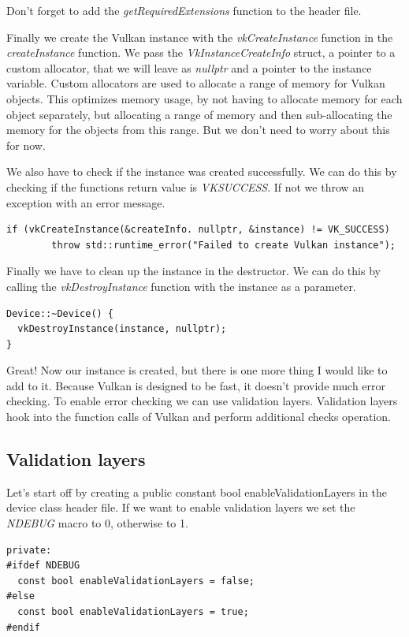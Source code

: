 \documentclass[12pt]{report} \usepackage{preamble}
\begin{document}
Don't forget to add the \textit{getRequiredExtensions} function to the header file.

Finally we create the Vulkan instance with the \textit{vkCreateInstance} function in the
\textit{createInstance} function. We pass the \textit{VkInstanceCreateInfo} struct, a pointer to
a custom allocator, that we will leave as \textit{nullptr} and a pointer to the instance variable.
Custom allocators are used to allocate a range of memory for Vulkan objects. This optimizes memory usage, by
not having to allocate memory for each object separately, but allocating a range of memory and then
sub-allocating the memory for the objects from this range. But we don't need to worry about this for now.

We also have to check if the instance was created successfully. We can do this by checking if the
functions return value is \textit{VK\textunderscore SUCCESS}. If not we throw an exception with an error message.

\begin{lstlisting}[Language=C++]
if (vkCreateInstance(&createInfo. nullptr, &instance) != VK_SUCCESS) 
		throw std::runtime_error("Failed to create Vulkan instance");
\end{lstlisting}

Finally we have to clean up the instance in the destructor. We can do this by calling the
\textit{vkDestroyInstance} function with the instance as a parameter.

\begin{lstlisting}[Language=C++]
Device::~Device() {
  vkDestroyInstance(instance, nullptr);
}
\end{lstlisting}

Great! Now our instance is created, but there is one more thing I would like to
add to it. Because Vulkan is designed to be fast, it doesn't
provide much error checking. To enable error checking we can use validation layers.
Validation layers hook into the function calls of Vulkan and perform additional checks
operation.

\subsection{Validation layers}

Let's start off by creating a public constant bool enableValidationLayers in the device class header file.
If we want to enable validation layers we set the \textit{NDEBUG} macro to 0, otherwise to 1.

\begin{lstlisting}[Language=C++]
private:
#ifdef NDEBUG 
  const bool enableValidationLayers = false;
#else
  const bool enableValidationLayers = true;
#endif
\end{lstlisting}
\end{document}
